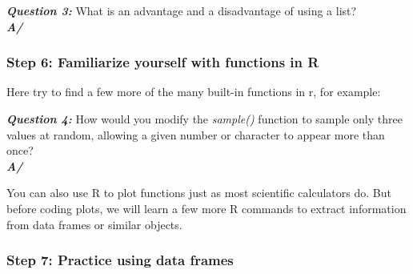 \documentclass[]{article}
\newenvironment{Shaded}{\begin{snugshade}}{\end{snugshade}}
\newcommand{\CommentTok}[1]{\textcolor[rgb]{0.56,0.35,0.01}{\textit{#1}}}
\newcommand{\DataTypeTok}[1]{\textcolor[rgb]{0.13,0.29,0.53}{#1}}
\newcommand{\DecValTok}[1]{\textcolor[rgb]{0.00,0.00,0.81}{#1}}
\newcommand{\KeywordTok}[1]{\textcolor[rgb]{0.13,0.29,0.53}{\textbf{#1}}}
\newcommand{\NormalTok}[1]{#1}
\newcommand{\OperatorTok}[1]{\textcolor[rgb]{0.81,0.36,0.00}{\textbf{#1}}}
\newcommand{\OtherTok}[1]{\textcolor[rgb]{0.56,0.35,0.01}{#1}}
\begin{document}
\textbf{\emph{Question 3:}} What is an advantage and a disadvantage of
using a list?\\
\textbf{\emph{A/}}

\hypertarget{step-6-familiarize-yourself-with-functions-in-r}{%
\subsubsection{Step 6: Familiarize yourself with functions in
R}\label{step-6-familiarize-yourself-with-functions-in-r}}

Here try to find a few more of the many built-in functions in r, for
example:

\begin{Shaded}
\end{Shaded}

\textbf{\emph{Question 4:}} How would you modify the \emph{sample()}
function to sample only three values at random, allowing a given number
or character to appear more than once?\\
\textbf{\emph{A/}}

You can also use R to plot functions just as most scientific calculators
do. But before coding plots, we will learn a few more R commands to
extract information from data frames or similar objects.

\hypertarget{step-7-practice-using-data-frames}{%
\subsubsection{Step 7: Practice using data
frames}\label{step-7-practice-using-data-frames}}
\end{document}
